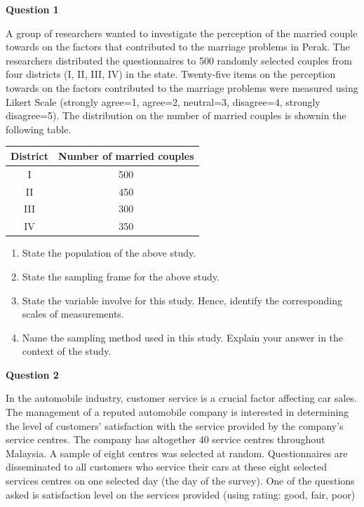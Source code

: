 \documentclass[
  a4paper,
  DIV=11,
  numbers=noendperiod,
  oneside]{scrreprt}
\providecommand{\tightlist}{%
  \setlength{\itemsep}{0pt}\setlength{\parskip}{0pt}}\usepackage{longtable,booktabs,array}
\begin{document}
\textbf{Question 1}

A group of researchers wanted to investigate the perception of the
married couple towards on the factors that contributed to the marriage
problems in Perak. The researchers distributed the questionnaires to 500
randomly selected couples from four districts (I, II, III, IV) in the
state. Twenty-five items on the perception towards on the factors
contributed to the marriage problems were measured using Likert Scale
(strongly agree=1, agree=2, neutral=3, disagree=4, strongly disagree=5).
The distribution on the number of married couples is shownin the
following table.

\begin{longtable}[]{@{}cc@{}}
\toprule\noalign{}
District & Number of married couples \\
\midrule\noalign{}
\endhead
\bottomrule\noalign{}
\endlastfoot
I & 500 \\
II & 450 \\
III & 300 \\
IV & 350 \\
\end{longtable}

\begin{enumerate}
\def\labelenumi{\alph{enumi})}
\tightlist
\item
  State the population of the above study.
\item
  State the sampling frame for the above study.
\item
  State the variable involve for this study. Hence, identify the
  corresponding scales of measurements.
\item
  Name the sampling method used in this study. Explain your answer in
  the context of the study.
\end{enumerate}

\textbf{Question 2}

In the automobile industry, customer service is a crucial factor
affecting car sales. The management of a reputed automobile company is
interested in determining the level of customers' satisfaction with the
service provided by the company's service centres. The company has
altogether 40 service centres throughout Malaysia. A sample of eight
centres was selected at random. Questionnaires are disseminated to all
customers who service their cars at these eight selected services
centres on one selected day (the day of the survey). One of the
questions asked is satisfaction level on the services provided (using
rating: good, fair, poor)
\end{document}
